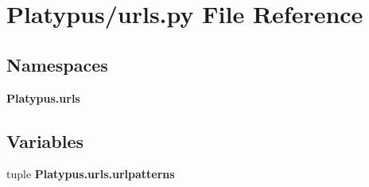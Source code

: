 \section{Platypus/urls.py File Reference}
\label{_platypus_2urls_8py}
\subsection*{Namespaces}
\begin{DoxyCompactItemize}
\item 
 {\bf Platypus.\+urls}
\end{DoxyCompactItemize}
\subsection*{Variables}
\begin{DoxyCompactItemize}
\item 
tuple {\bf Platypus.\+urls.\+urlpatterns}
\end{DoxyCompactItemize}
